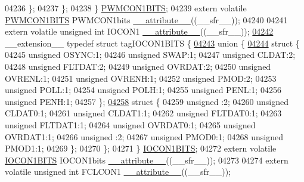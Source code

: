 \begin{DoxyCode}
04236     \};
04237   \};
04238 \} \hyperlink{a00008_d5/d40/a00672}{PWMCON1BITS};
04239 \textcolor{keyword}{extern} \textcolor{keyword}{volatile} \hyperlink{a00008_d5/d40/a00672}{PWMCON1BITS} PWMCON1bits \hyperlink{a00009_a493c46f03454991ccc5aa7a6e1dfb2a7}{\_\_attribute\_\_}((\_\_sfr\_\_));
04240 
04241 \textcolor{keyword}{extern} \textcolor{keyword}{volatile} \textcolor{keywordtype}{unsigned} \textcolor{keywordtype}{int}  IOCON1 \hyperlink{a00009_a493c46f03454991ccc5aa7a6e1dfb2a7}{\_\_attribute\_\_}((\_\_sfr\_\_));
\hypertarget{a00009_source_l04242}{}\hyperlink{a00008}{04242} \_\_extension\_\_ \textcolor{keyword}{typedef} \textcolor{keyword}{struct }tagIOCON1BITS \{
\hypertarget{a00009_source_l04243}{}\hyperlink{a00009}{04243}   \textcolor{keyword}{union }\{
\hypertarget{a00009_source_l04244}{}\hyperlink{a00009}{04244}     \textcolor{keyword}{struct }\{
04245       \textcolor{keywordtype}{unsigned} OSYNC:1;
04246       \textcolor{keywordtype}{unsigned} SWAP:1;
04247       \textcolor{keywordtype}{unsigned} CLDAT:2;
04248       \textcolor{keywordtype}{unsigned} FLTDAT:2;
04249       \textcolor{keywordtype}{unsigned} OVRDAT:2;
04250       \textcolor{keywordtype}{unsigned} OVRENL:1;
04251       \textcolor{keywordtype}{unsigned} OVRENH:1;
04252       \textcolor{keywordtype}{unsigned} PMOD:2;
04253       \textcolor{keywordtype}{unsigned} POLL:1;
04254       \textcolor{keywordtype}{unsigned} POLH:1;
04255       \textcolor{keywordtype}{unsigned} PENL:1;
04256       \textcolor{keywordtype}{unsigned} PENH:1;
04257     \};
\hypertarget{a00009_source_l04258}{}\hyperlink{a00009}{04258}     \textcolor{keyword}{struct }\{
04259       \textcolor{keywordtype}{unsigned} :2;
04260       \textcolor{keywordtype}{unsigned} CLDAT0:1;
04261       \textcolor{keywordtype}{unsigned} CLDAT1:1;
04262       \textcolor{keywordtype}{unsigned} FLTDAT0:1;
04263       \textcolor{keywordtype}{unsigned} FLTDAT1:1;
04264       \textcolor{keywordtype}{unsigned} OVRDAT0:1;
04265       \textcolor{keywordtype}{unsigned} OVRDAT1:1;
04266       \textcolor{keywordtype}{unsigned} :2;
04267       \textcolor{keywordtype}{unsigned} PMOD0:1;
04268       \textcolor{keywordtype}{unsigned} PMOD1:1;
04269     \};
04270   \};
04271 \} \hyperlink{a00008_dc/d1c/a00504}{IOCON1BITS};
04272 \textcolor{keyword}{extern} \textcolor{keyword}{volatile} \hyperlink{a00008_dc/d1c/a00504}{IOCON1BITS} IOCON1bits \hyperlink{a00009_a493c46f03454991ccc5aa7a6e1dfb2a7}{\_\_attribute\_\_}((\_\_sfr\_\_));
04273 
04274 \textcolor{keyword}{extern} \textcolor{keyword}{volatile} \textcolor{keywordtype}{unsigned} \textcolor{keywordtype}{int}  FCLCON1 \hyperlink{a00009_a493c46f03454991ccc5aa7a6e1dfb2a7}{\_\_attribute\_\_}((\_\_sfr\_\_));

\end{DoxyCode}
